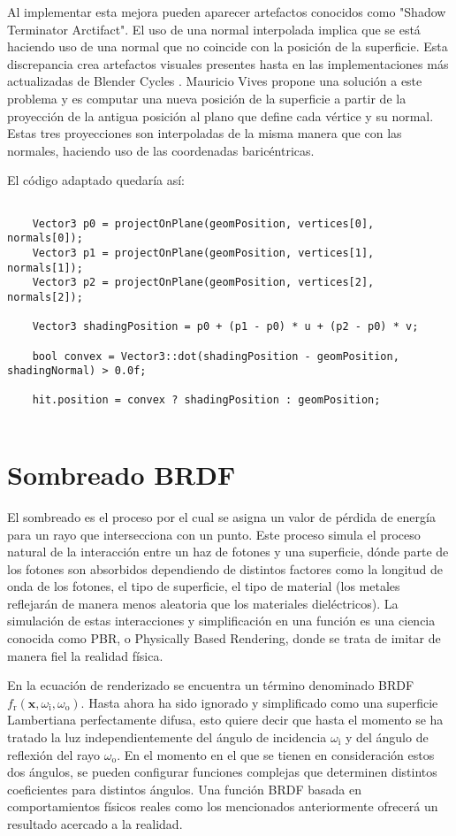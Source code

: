 Al implementar esta mejora pueden aparecer artefactos conocidos como "Shadow Terminator Arctifact". El uso de una normal interpolada implica que se está haciendo uso de una normal que no coincide con la posición de la superficie. Esta discrepancia crea artefactos visuales presentes hasta en las implementaciones más actualizadas de Blender Cycles . Mauricio Vives propone una solución a este problema y es computar una nueva posición de la superficie a partir de la proyección de la antigua posición al plano que define cada vértice y su normal. Estas tres proyecciones son interpoladas de la misma manera que con las normales, haciendo uso de las coordenadas baricéntricas.
	
El código adaptado quedaría así:
	
\begin{lstlisting}
	
	Vector3 p0 = projectOnPlane(geomPosition, vertices[0], normals[0]);
    Vector3 p1 = projectOnPlane(geomPosition, vertices[1], normals[1]);
    Vector3 p2 = projectOnPlane(geomPosition, vertices[2], normals[2]);

    Vector3 shadingPosition = p0 + (p1 - p0) * u + (p2 - p0) * v;

    bool convex = Vector3::dot(shadingPosition - geomPosition, shadingNormal) > 0.0f;
	
	hit.position = convex ? shadingPosition : geomPosition;
	
\end{lstlisting}
	
	\section{Sombreado BRDF}
	
El sombreado es el proceso por el cual se asigna un valor de pérdida de energía para un rayo que intersecciona con un punto. Este proceso simula el proceso natural de la interacción entre un haz de fotones y una superficie, dónde parte de los fotones son absorbidos dependiendo de distintos factores como la longitud de onda de los fotones, el tipo de superficie, el tipo de material (los metales reflejarán de manera menos aleatoria que los materiales dieléctricos). La simulación de estas interacciones y simplificación en una función es una ciencia conocida como PBR, o Physically Based Rendering, donde se trata de imitar de manera fiel la realidad física. 
		
En la ecuación de renderizado se encuentra un término denominado BRDF $f_{\text{r}}(\mathbf {x} ,\omega _{\text{i}},\omega _{\text{o}})$. Hasta ahora ha sido ignorado y simplificado como una superficie Lambertiana perfectamente difusa, esto quiere decir que hasta el momento se ha tratado la luz independientemente del ángulo de incidencia $\omega _{\text{i}}$ y del ángulo de reflexión del rayo $\omega _{\text{o}}$. En el momento en el que se tienen en consideración estos dos ángulos, se pueden configurar funciones complejas que determinen distintos coeficientes para distintos ángulos. Una función BRDF basada en comportamientos físicos reales como los mencionados anteriormente ofrecerá un resultado acercado a la realidad. 
	
